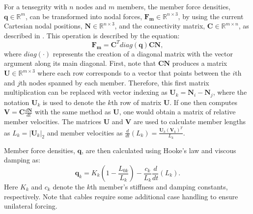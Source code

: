 {For a tensegrity with $n$ nodes and $m$ members, the member force densities, 
$\boldsymbol{q}\in\mathbb{R}^{m}$, can be transformed into nodal forces,
$\boldsymbol{F_m}\in\mathbb{R}^{n\times 3}$, by using the current Cartesian nodal positions,
$\boldsymbol{N}\in\mathbb{R}^{n\times 3}$, and the connectivity matrix,
$\boldsymbol{C}\in\mathbb{R}^{m\times n}$, as described in \cite{skelton2009tensegrity}. This operation is described by the equation:
$$
\boldsymbol{F_m} = \boldsymbol{C}^{T} diag(\boldsymbol{q}) \boldsymbol{C} \boldsymbol{N},
$$
where $diag(\cdot)$ represents the creation of a diagonal matrix with the vector argument along its main diagonal.
First, note that $\boldsymbol{C} \boldsymbol{N}$ produces a matrix $\boldsymbol{U}\in\mathbb{R}^{m\times 3}$ where each row corresponds to a vector that points between the $i$th and $j$th nodes spanned by each member. 
Therefore, this first matrix multiplication can be replaced with vector indexing as $\boldsymbol{U}_{k} = \boldsymbol{N}_{i} - \boldsymbol{N}_{j}$,
where the notation $\boldsymbol{U}_{k}$ is used to denote the $k$th row of matrix $\boldsymbol{U}$. If one then computes $\boldsymbol{V}=\boldsymbol{C}\frac{d\boldsymbol{N}}{dt}$ with the same method
as $\boldsymbol{U}$, one would obtain a matrix of relative member velocities.
The matrices $\boldsymbol{U}$ and $\boldsymbol{V}$ are used to calculate member lengths as $L_k = |\boldsymbol{U}_k|_2$ and member velocities as $\frac{d}{dt}(L_k) = \frac{\boldsymbol{U}_k(\boldsymbol{V}_k)^T}{L_k}.$

Member force densities, $\boldsymbol{q}$, are then calculated using Hooke's law and viscous damping as:
$$
\boldsymbol{q}_k = K_k(1 - \frac{L_{0k}}{L_k}) - \frac{c_k}{L_k} \frac{d}{dt}(L_k).
$$
Here $K_k$ and $c_k$ denote the $k$th member's stiffness and damping constants, respectively.
Note that cables require some additional case handling to ensure unilateral forcing.

}
